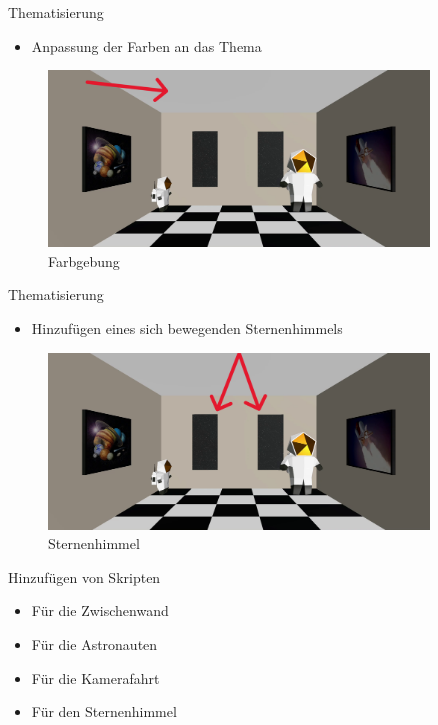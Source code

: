 \documentclass{beamer}
\begin{document}
\begin{frame}{Thematisierung}
\begin{itemize}
\item Anpassung der Farben an das Thema
\end{itemize}
\begin{figure}
    \centering
\includegraphics[width=0.9\textwidth, keepaspectratio]{img/thema3}
\caption{Farbgebung}
\end{figure}
\end{frame}

\begin{frame}{Thematisierung}
\begin{itemize}
\item Hinzufügen eines sich bewegenden Sternenhimmels
\end{itemize}
\begin{figure}
    \centering
\includegraphics[width=0.9\textwidth, keepaspectratio]{img/thema4}
\caption{Sternenhimmel \cite{nightsky}}
\end{figure}
\end{frame}

\begin{frame}{Hinzufügen von Skripten}
\begin{itemize}
\item Für die Zwischenwand
\item Für die Astronauten
\item Für die Kamerafahrt
\item Für den Sternenhimmel
\end{itemize}
\end{frame}
\end{document}
